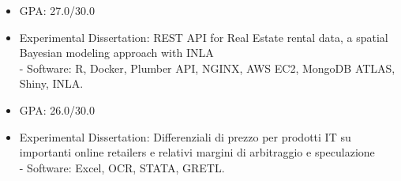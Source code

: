 \documentclass[10pt,a4paper,ragged2e]{altacv}
\begin{document}

\begin{fullwidth}
\makecvheader
\end{fullwidth}




\begin{itemize}
\item GPA: 27.0/30.0\\
\item Experimental Dissertation: REST API for Real Estate rental data, a spatial Bayesian modeling approach with INLA \\
\smallskip
- Software: R, Docker, Plumber API, NGINX, AWS EC2, MongoDB ATLAS, Shiny, INLA.
\end{itemize}

\divider

\begin{itemize}
\item GPA: 26.0/30.0\\
\item Experimental Dissertation: Differenziali di prezzo per prodotti IT
su importanti online retailers e relativi margini di arbitraggio e speculazione\\
\smallskip
- Software: Excel, OCR, STATA, GRETL.
\end{itemize}
\end{document}
